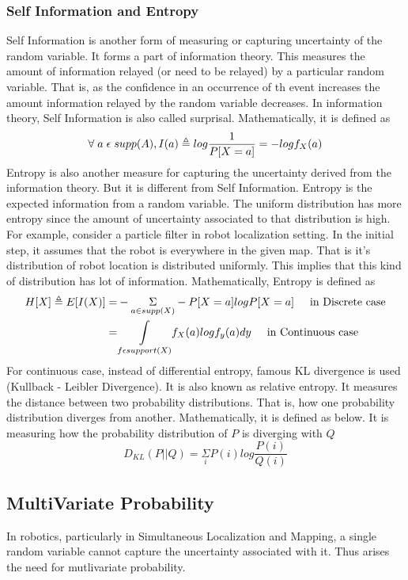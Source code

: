 \documentclass[12pt]{report} %
\begin{document}
	\subsubsection*{Self Information and Entropy}
	Self Information is another form of measuring or capturing uncertainty of the random variable. It forms a part of information theory. This measures the amount of information relayed (or need to be relayed) by a particular random variable. That is, as the confidence in an occurrence of th event increases the amount information relayed by the random variable decreases. In information theory, Self Information is also called surprisal. Mathematically, it is defined as 
	\begin{equation*}
		\forall\hspace{0.1cm} a\hspace{0.1cm} \epsilon \hspace{0.1cm}supp(A), I(a) \triangleq log \frac{1}{P[X=a]} = -log f_X(a)
	\end{equation*}
	Entropy is also another measure for capturing the uncertainty derived from the information theory. But it is different from Self Information. Entropy is the expected information from a random variable. The uniform distribution has more entropy since the amount of uncertainty associated to that distribution is high. For example, consider a particle filter in robot localization setting. In the initial step, it assumes that the robot is everywhere in the given map. That is it's distribution of robot location is distributed uniformly. This implies that this kind of distribution has lot of information. Mathematically, Entropy is defined as
	\begin{align*}
		H[X] \triangleq E[I(X)] =& - \underset{a \in supp(X)}{\Sigma} -P[X=a]logP[X=a]\hspace{0.5cm}\text{in Discrete case}\\
		=& \underset{{f \epsilon support(X)}}{\int} f_X(a)logf_y(a)dy \hspace{0.5cm} \text{in Continuous case}
	\end{align*}
	For continuous case, instead of differential entropy, famous KL divergence is used (Kullback - Leibler Divergence). It is also known as relative entropy. It measures the distance between two probability distributions. That is, how one probability distribution diverges from another. Mathematically, it is defined as below. It is measuring how the probability distribution of $P$ is diverging with $Q$ 
	\begin{equation*}
		D_{KL}(P||Q) = \underset{i}{\Sigma}P(i)log\frac{P(i)}{Q(i)}			
	\end{equation*}
	\begin{center}
		\subsection*{MultiVariate Probability}
	\end{center}
	In robotics, particularly in Simultaneous Localization and Mapping, a single random variable cannot capture the uncertainty associated with it. Thus arises the need for mutlivariate probability.\\
	
\end{document}
